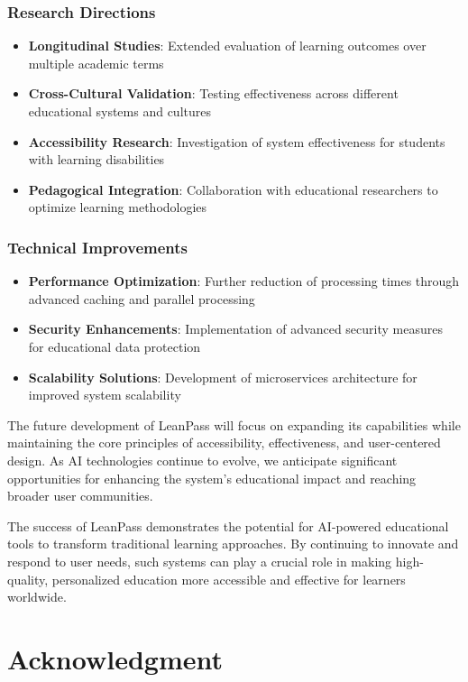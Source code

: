 \documentclass[conference]{IEEEtran}
\begin{document}
\subsubsection{Research Directions}
\begin{itemize}
\item \textbf{Longitudinal Studies}: Extended evaluation of learning outcomes over multiple academic terms
\item \textbf{Cross-Cultural Validation}: Testing effectiveness across different educational systems and cultures
\item \textbf{Accessibility Research}: Investigation of system effectiveness for students with learning disabilities
\item \textbf{Pedagogical Integration}: Collaboration with educational researchers to optimize learning methodologies
\end{itemize}

\subsubsection{Technical Improvements}
\begin{itemize}
\item \textbf{Performance Optimization}: Further reduction of processing times through advanced caching and parallel processing
\item \textbf{Security Enhancements}: Implementation of advanced security measures for educational data protection
\item \textbf{Scalability Solutions}: Development of microservices architecture for improved system scalability
\end{itemize}

The future development of LeanPass will focus on expanding its capabilities while maintaining the core principles of accessibility, effectiveness, and user-centered design. As AI technologies continue to evolve, we anticipate significant opportunities for enhancing the system's educational impact and reaching broader user communities.

The success of LeanPass demonstrates the potential for AI-powered educational tools to transform traditional learning approaches. By continuing to innovate and respond to user needs, such systems can play a crucial role in making high-quality, personalized education more accessible and effective for learners worldwide.

\section*{Acknowledgment}
\end{document}
